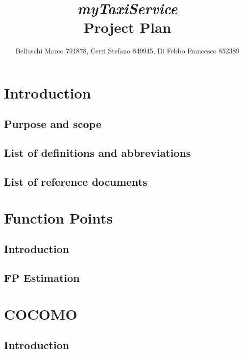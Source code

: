 \documentclass[]{report}
\begin{document}
\title{{\Huge\textit{myTaxiService}}\\{\Large Project Plan}}
\author{Belluschi Marco 791878, Cerri Stefano 849945, Di Febbo Francesco 852389}

\maketitle

\tableofcontents

\chapter{Introduction}

	\section{Purpose and scope}
	
	
	\section{List of definitions and abbreviations}
	

	\section{List of reference documents}
	

\chapter{Function Points}

	\section{Introduction}
	
	
	\section{FP Estimation}
	


\chapter{COCOMO}

	\section{Introduction}
	
	
\end{document}
